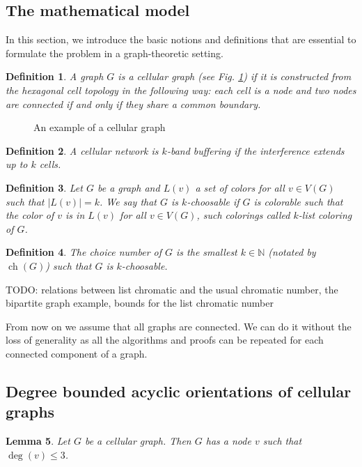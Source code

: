 \documentclass[a4paper, 12pt]{article}
\newtheorem{lem}{Lemma}[section]
\newtheorem{defin}[lem]{Definition}
\DeclareMathOperator*{\ch}{ch}
\begin{document}
\subsection{The mathematical model}
In this section, we introduce the basic notions and definitions that are essential to formulate the problem in a graph-theoretic setting.
\begin{defin} A graph $G$ is a  \textit{cellular graph} (see Fig. \ref{fig:cellular-graph}) if it is constructed from the hexagonal cell topology in the following way: each cell is a node and two nodes are connected if and only if they share a common boundary.
\end{defin}
\begin{figure}[!h]
\centering
\caption{An example of a cellular graph}\label{fig:cellular-graph}
\end{figure}
\begin{defin} A cellular network is $k$\textit{-band buffering} if the interference extends up to $k$ cells.
\end{defin}
\begin{defin} Let $G$ be a graph and $L(v)$ a set of colors for all $v \in V(G)$ such that $|L(v)|=k$. We say that $G$ is $k$\textit{-choosable} if $G$ is colorable such that the color of $v$ is in $L(v)$ for all $v \in V(G)$, such colorings called $k$\textit{-list coloring} of $G$.
\end{defin}
\begin{defin} The \textit{choice number} of $G$ is the smallest $k \in \mathbb{N}$ (notated by $\ch(G)$) such that $G$ is $k$-choosable.
\end{defin}

TODO: relations between list chromatic and the usual chromatic number, the bipartite graph example, bounds for the list chromatic number

From now on we assume that all graphs are connected. We can do it without the loss of generality as all the algorithms and proofs can be repeated for each connected component of a graph.

\subsection{Degree bounded acyclic orientations of cellular graphs}\label{sec:orientation}



\begin{lem}\label{lem:degree-constraint}
Let $G$ be a cellular graph. Then $G$ has a node $v$ such that $\deg(v) \leqslant 3$.
\end{lem}
\end{document}
